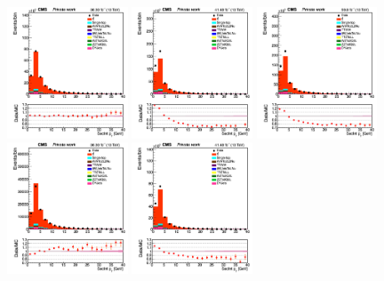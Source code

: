 \documentclass{cernatlasnote}
\begin{document}
    \begin{figure}[htp]
\centering
\includegraphics[width=0.32\textwidth]{images/emu_channel/2016/16_Range_0pt7_1pt3/SecInt_pt_Selec_Linear.png}
\includegraphics[width=0.32\textwidth]{images/emu_channel/2017/17_Range_0pt7_1pt3/SecInt_pt_Selec_Linear.png}
 \includegraphics[width=0.32\textwidth]{images/emu_channel/2018/18_Range_0pt7_1pt3/SecInt_pt_Selec_Linear.png}\\
 \includegraphics[width=0.32\textwidth]{images/emu_channel/2016/16_Range_0pt7_1pt3/SecInt_pt_TrackerMatched_Linear.png}
\includegraphics[width=0.32\textwidth]{images/emu_channel/2017/17_Range_0pt7_1pt3/SecInt_pt_TrackerMatched_Linear.png}

\end{figure}
\end{document}
